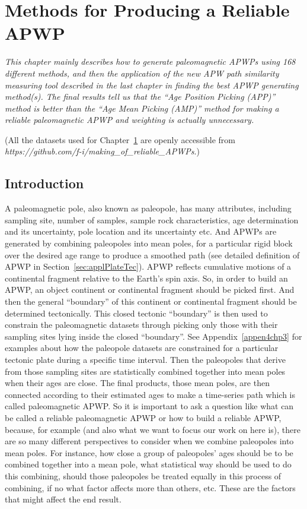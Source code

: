 \chapter{Methods for Producing a Reliable APWP}\label{chap:Reliab}  %
\textit{This chapter mainly describes how to generate paleomagnetic APWPs using
168 different methods, and then the application of the new APW path similarity
measuring tool described in the last chapter in finding the best APWP generating
method(s). The final results tell us that the ``Age Position Picking (APP)''  %
method is better than the ``Age Mean Picking (AMP)'' method for making a
reliable paleomagnetic APWP and weighting is actually unnecessary.}
\vfill
\minitoc\newpage

(All the datasets used for Chapter~\ref{chap:Reliab} are openly accessible from
\emph{https://github.com/f-i/making\_of\_reliable\_APWPs}.)

\section{Introduction}

A paleomagnetic pole, also known as paleopole, has many attributes, including
sampling site, number of samples, sample rock characteristics, age determination
and its uncertainty, pole location and its uncertainty etc. And APWPs are
generated by combining paleopoles into mean poles, for a particular rigid block
over the desired age range to produce a smoothed path (see detailed definition
of APWP in Section~\ref{sec:applPlateTec}). APWP reflects cumulative motions of
a continental fragment relative to the Earth's spin axis. So, in order to build
an APWP, an object continent or continental fragment should be picked first. And
then the general ``boundary'' of this continent or continental fragment should
be determined tectonically. This closed tectonic ``boundary'' is then used to
constrain the paleomagnetic datasets through picking only those with their
sampling sites lying inside the closed ``boundary''. See
Appendix~\ref{appen4chp3}
for examples about how the paleopole datasets are constrained for a particular
tectonic plate during a specific time interval. Then the paleopoles that derive
from those sampling sites are statistically combined together into mean poles
when their ages are close. The final products, those mean poles, are then
connected according to their estimated ages to make a time-series path which is
called paleomagnetic APWP\@. So it is important to ask a question like what can
be called a reliable paleomagnetic APWP or how to build a reliable APWP,
because, for example (and also what we want to focus our work on here is), there
are so many different perspectives to consider when we combine paleopoles into
mean poles. For instance, how close a group of paleopoles' ages should be to be
combined together into a mean pole, what statistical way should be used to do
this combining, should those paleopoles be treated equally in this process of
combining, if no what factor affects more than others, etc. These are the
factors that might affect the end result.

